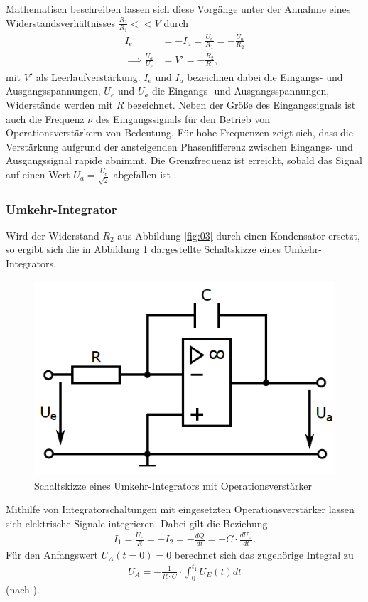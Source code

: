 Mathematisch beschreiben lassen sich diese Vorgänge unter der Annahme eines
Widerstandsverhältnisses $\frac{R_2}{R_1} << V$ durch \\
\begin{align}
  I_e &= - I_a = \frac{U_e}{R_1} = - \frac{U_a}{R_2} \\
  \implies \frac{U_a}{U_e} &= V' = -\frac{R_2}{R_1},
  \label{eqn:05}
\end{align}
\noindent mit $V'$ als Leerlaufverstärkung. $I_e$ und $I_a$ bezeichnen dabei die
Eingangs- und Ausgangsspannungen, $U_e$ und $U_a$ die Eingangs- und Ausgangsspannungen,
Widerstände werden mit $R$ bezeichnet.
Neben der Größe des Eingangssignals
ist auch die Frequenz $\nu$ des Eingangssignals für den Betrieb von
Operationsverstärkern von Bedeutung. Für hohe Frequenzen zeigt sich, dass die
Verstärkung aufgrund der ansteigenden Phasenfifferenz zwischen Eingangs- und
Ausgangssignal rapide abnimmt.
Die Grenzfrequenz ist erreicht, sobald das
Signal auf einen Wert $U_a = \frac{U_e}{\sqrt{2}}$ abgefallen ist \cite{federau, sample}.
\subsubsection{Umkehr-Integrator}
\noindent Wird der Widerstand $R_2$ aus Abbildung \ref{fig:03} durch einen
Kondensator ersetzt, so ergibt sich die in Abbildung \ref{fig:04} dargestellte
Schaltskizze eines Umkehr-Integrators. \\
\FloatBarrier
\begin{figure}
  \centering
  \includegraphics{ressources/figure_04.png}
  \caption{Schaltskizze eines Umkehr-Integrators mit Operationsverstärker \cite{sample}}
  \label{fig:04}
\end{figure}
\FloatBarrier
\noindent Mithilfe von Integratorschaltungen mit eingesetzten
Operationsverstärker lassen sich elektrische Signale integrieren. Dabei gilt die
Beziehung
\begin{align}
  I_1 = \frac{U_e}{R} = - I_2 = - \frac{dQ}{dt} = - C \cdot \frac{d U_A}{dt}.
  \label{eqn:06}
\end{align}
\noindent Für den Anfangswert $U_A(t=0) = 0$ berechnet sich das zugehörige
Integral zu
\begin{align}
  U_A = - \frac{1}{R \cdot C} \cdot \int_0^{t_1} U_E(t) dt
  \label{eqn:07}
\end{align}
\noindent (nach \cite{muenster}).
